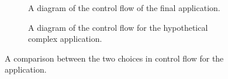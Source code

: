 \documentclass{article}
\begin{document}
\begin{figure}[H]
	\centering
	\begin{subfigure}{0.45\textwidth}
		\caption{A diagram of the control flow of the final application.}
		\label{subfigure:applicationControlFlow}
	\end{subfigure}
	\hfill
	\begin{subfigure}{0.45\textwidth}
		\caption{A diagram of the control flow for the hypothetical complex application.}
		\label{subfigure:adaptedControlFlow}
	\end{subfigure}
	\caption{A comparison between the two choices in control flow for the application.}
	\label{figure:controlFlowComparisons}
\end{figure}
\end{document}
